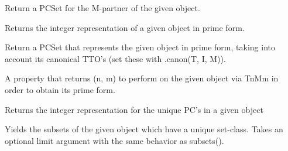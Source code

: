 \documentclass[letterpaper,10pt,english]{sphinxmanual}
\begin{document}
\begin{fulllineitems}
\begin{fulllineitems}
\end{fulllineitems}


\begin{fulllineitems}
\label{_templates/core:core.PPCSetBase.mpartner}
Return a PCSet for the M-partner of the given object.

\end{fulllineitems}


\begin{fulllineitems}
\label{_templates/core:core.PPCSetBase.pcint}
Returns the integer representation of a given object in prime form.

\end{fulllineitems}


\begin{fulllineitems}
\label{_templates/core:core.PPCSetBase.prime}
Return a PCSet that represents the given object in prime form, taking
into account its canonical TTO's (set these with .canon(T, I, M)).

\end{fulllineitems}


\begin{fulllineitems}
\label{_templates/core:core.PPCSetBase.prime_operation}
A property that returns (n, m) to perform on the given object via TnMm
in order to obtain its prime form.

\end{fulllineitems}


\begin{fulllineitems}
\label{_templates/core:core.PPCSetBase.setint}
Returns the integer representation for the unique PC's in a given
object

\end{fulllineitems}


\begin{fulllineitems}
\label{_templates/core:core.PPCSetBase.subprimes}
Yields the subsets of the given object which have a unique set-class.
Takes an optional limit argument with the same behavior as subsets().


\end{fulllineitems}
\end{fulllineitems}
\end{document}
